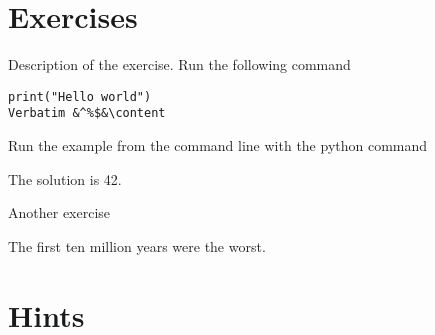 \documentclass{article}
\newcounter{hint}
\newcounter{hints}
\newcommand\printhints{%
  \ForEachUsedExerciseByType{\setcounter{hint}{0}\GetExerciseProperty{hint}}%
}
\begin{document}
\section{Exercises}
\begin{exercise}
  Description of the exercise. Run the following command
\begin{verbatim}
print("Hello world")
Verbatim &^%$&\content
\end{verbatim}
\begin{hint}
  Run the example from the command line with the python command
\end{hint}
\begin{hint}
  The solution is 42.
\end{hint}
\end{exercise}

\begin{exercise}
  Another exercise
  \begin{hint}
    The first ten million years were the worst.
  \end{hint}
\end{exercise}

\section{Hints}
\printhints
\end{document}
